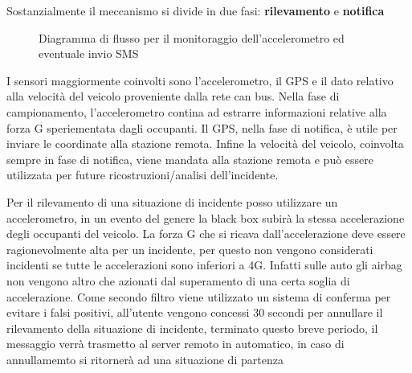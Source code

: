 \documentclass[12pt, a4paper, italian]{report}
\numberwithin{figure}{chapter}
\numberwithin{table}{chapter}
\begin{document}
Sostanzialmente il meccanismo si divide in due fasi: \textbf{rilevamento} e \textbf{notifica}

\begin{figure}[h]
    \centering
    \caption{Diagramma di flusso per il monitoraggio dell'accelerometro ed eventuale invio SMS}
    \label{fig:diagramma-flusso}
\end{figure}

I sensori maggiormente coinvolti sono l'accelerometro, il GPS e il dato relativo alla velocità del veicolo proveniente dalla rete can bus. Nella fase di campionamento, l'accelerometro contina ad estrarre informazioni relative alla forza G speriementata dagli occupanti. Il GPS, nella fase di notifica, è utile per inviare le coordinate alla stazione remota. Infine la velocità del veicolo, coinvolta sempre in fase di notifica, viene mandata alla stazione remota e può essere utilizzata per future ricostruzioni/analisi dell'incidente.

Per il rilevamento di una situazione di incidente posso utilizzare un accelerometro, in un evento del genere la black box subirà la stessa accelerazione degli occupanti del veicolo. La forza G che si ricava dall'accelerazione deve essere ragionevolmente alta per un incidente, per questo non vengono considerati incidenti se tutte le accelerazioni sono inferiori a 4G. Infatti sulle auto gli airbag non vengono altro che azionati dal superamento di una certa soglia di accelerazione. Come secondo filtro viene utilizzato un sistema di conferma per evitare i falsi positivi, all'utente vengono concessi 30 secondi per annullare il rilevamento della situazione di incidente, terminato questo breve periodo, il messaggio verrà trasmetto al server remoto in automatico, in caso di annullamemto si ritornerà ad una situazione di partenza
\end{document}
